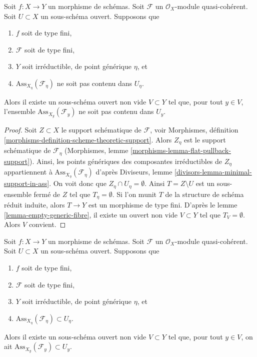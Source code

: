 \begin{lemma}
\label{lemma-bad-case}
Soit $f : X \to Y$ un morphisme de schémas. Soit $\mathcal{F}$ un
$\mathcal{O}_X$-module quasi-cohérent. Soit $U \subset X$ un sous-schéma
ouvert. Supposons que
\begin{enumerate}
\item $f$ soit de type fini,
\item $\mathcal{F}$ soit de type fini,
\item $Y$ soit irréductible, de point générique $\eta$, et
\item $\text{Ass}_{X_\eta}(\mathcal{F}_\eta)$ ne soit pas contenu dans $U_\eta$.
\end{enumerate}
Alors il existe un sous-schéma ouvert non vide $V \subset Y$ tel que,
pour tout $y \in V$, l'ensemble $\text{Ass}_{X_y}(\mathcal{F}_y)$ ne soit pas
contenu dans $U_y$.
\end{lemma}

\begin{proof}
Soit $Z \subset X$ le support schématique de $\mathcal{F}$, voir
Morphismes, définition \ref{morphisms-definition-scheme-theoretic-support}.
Alors $Z_\eta$ est le support schématique de $\mathcal{F}_\eta$
(Morphismes, lemme \ref{morphisms-lemma-flat-pullback-support}).
Ainsi, les points génériques des composantes irréductibles de $Z_\eta$
appartiennent à $\text{Ass}_{X_\eta}(\mathcal{F}_\eta)$ d'après
Diviseurs, lemme \ref{divisors-lemma-minimal-support-in-ass}.
On voit donc que $Z_\eta \cap U_\eta = \emptyset$.
Ainsi $T = Z \setminus U$ est un sous-ensemble fermé de $Z$ tel que $T_\eta = \emptyset$.
Si l'on munit $T$ de la structure de schéma réduit induite, alors
$T \to Y$ est un morphisme de type fini. D'après le
lemme \ref{lemma-empty-generic-fibre},
il existe un ouvert non vide $V \subset Y$ tel que $T_V = \emptyset$.
Alors $V$ convient.
\end{proof}

\begin{lemma}
\label{lemma-good-case}
Soit $f : X \to Y$ un morphisme de schémas. Soit $\mathcal{F}$ un
$\mathcal{O}_X$-module quasi-cohérent. Soit $U \subset X$ un sous-schéma
ouvert. Supposons que
\begin{enumerate}
\item $f$ soit de type fini,
\item $\mathcal{F}$ soit de type fini,
\item $Y$ soit irréductible, de point générique $\eta$, et
\item $\text{Ass}_{X_\eta}(\mathcal{F}_\eta) \subset U_\eta$.
\end{enumerate}
Alors il existe un sous-schéma ouvert non vide $V \subset Y$ tel que,
pour tout $y \in V$, on ait $\text{Ass}_{X_y}(\mathcal{F}_y) \subset U_y$.
\end{lemma}

